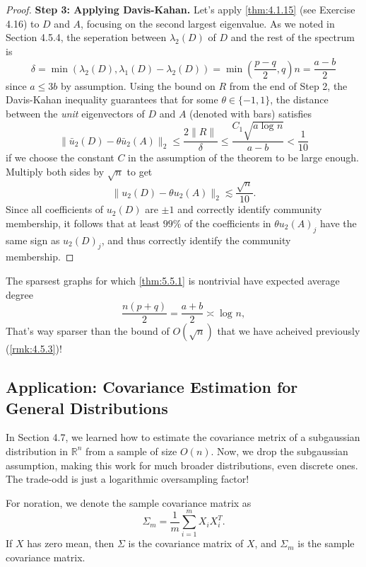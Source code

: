 \begin{proof}
\textbf{Step 3: Applying Davis-Kahan.} Let's apply \cref{thm:4.1.15} (see Exercise 4.16) to $D$ and $A$, 
focusing on the second largest eigenvalue. As we noted in Section 4.5.4, the seperation between $\lambda_2(D)$ 
of $D$ and the rest of the spectrum is
\[ \delta = \min_{}(\lambda_2(D), \lambda_1(D) - \lambda_2(D)) = \min_{}\left( \frac{p - q}{2}, q \right)n 
= \frac{a - b}{2} \]
since $a \leq 3b$ by assumption. Using the bound on $R$ from the end of Step 2, the Davis-Kahan inequality 
guarantees that for some $\theta \in \{ -1, 1 \}$, the distance between the \textit{unit} eigenvectors of $D$ 
and $A$ (denoted with bars) satisfies 
\[ \lVert \bar{u}_2(D) - \theta \bar{u}_2(A) \rVert_{2} \leq \frac{2 \lVert R \rVert_{}}{\delta} 
\leq \frac{C_1 \sqrt{a \log_{}{n}}}{a - b} < \frac{1}{10} \]
if we choose the constant $C$ in the assumption of the theorem to be large enough. Multiply both sides by 
$\sqrt{n}$ to get 
\[ \lVert u_2(D) - \theta u_2(A) \rVert_{2} \lesssim \frac{\sqrt{n}}{10}. \]
Since all coefficients of $u_2(D)$ are $\pm 1$ and correctly identify community membership, it follows that at 
least $99\%$ of the coefficients in $\theta u_2(A)_j$ have the same sign as $u_2(D)_j$, and thus correctly 
identify the community membership.
\end{proof}

\begin{remark}[Sparsity]
\label{rmk:5.5.2}
The sparsest graphs for which \cref{thm:5.5.1} is nontrivial have expected average degree
\[ \frac{n(p + q)}{2} = \frac{a + b}{2} \asymp \log_{}{n}, \]
That's way sparser than the bound of $O(\sqrt{n})$ that we have acheived previously (\cref{rmk:4.5.3})! 
\end{remark}



\subsection{Application: Covariance Estimation for General Distributions}
In Section 4.7, we learned how to estimate the covariance metrix of a subgaussian distribution in $\mathbb{R}^n$ 
from a sample of size $O(n)$. Now, we drop the subgaussian assumption, making this work for much broader 
distributions, even discrete ones. The trade-odd is just a logarithmic oversampling factor!

For noration, we denote the sample covariance matrix as 
\[ \Sigma_m = \frac{1}{m}\sum_{i = 1}^{m}X_i X_i^T. \]
If $X$ has zero mean, then $\Sigma$ is the covariance matrix of $X$, and $\Sigma_m$ is the sample covariance 
matrix.

